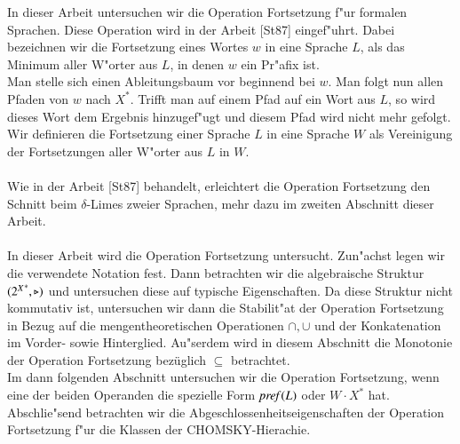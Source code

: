 In dieser Arbeit untersuchen wir die Operation Fortsetzung f"ur formalen Sprachen.
Diese Operation wird in der Arbeit [St87] eingef"uhrt. Dabei bezeichnen wir die Fortsetzung eines Wortes $w$ in eine Sprache $L$, als das Minimum aller W"orter aus $L$, in denen $w$ ein Pr"afix ist. 
\\Man stelle sich einen Ableitungsbaum vor beginnend bei $w$.
Man folgt nun allen Pfaden von $w$ nach $X^*$. Trifft man auf einem Pfad auf ein Wort aus $L$, so wird dieses Wort dem Ergebnis hinzugef"ugt und diesem Pfad wird nicht mehr gefolgt.\\
Wir definieren die Fortsetzung einer Sprache $L$ in eine Sprache $W$ als Vereinigung der Fortsetzungen aller W"orter aus $L$ in $W$.\\\\
Wie in der Arbeit [St87] behandelt, erleichtert die Operation Fortsetzung den Schnitt beim $\delta$-Limes zweier Sprachen, mehr dazu im zweiten Abschnitt dieser Arbeit.\\\\
In dieser Arbeit wird die Operation Fortsetzung untersucht. Zun"achst legen wir die verwendete Notation fest. Dann betrachten wir die algebraische Struktur $({2^X}^*,\triangleright)$ und untersuchen diese auf typische Eigenschaften.
Da diese Struktur nicht kommutativ ist, untersuchen wir dann die Stabilit"at der Operation Fortsetzung in Bezug auf die mengentheoretischen Operationen $\cap,\cup$ und der Konkatenation im Vorder- sowie Hinterglied.
Au"serdem wird in diesem Abschnitt die Monotonie der Operation Fortsetzung bezüglich $\subseteq$ betrachtet.
\\Im dann folgenden Abschnitt untersuchen wir die Operation Fortsetzung, wenn eine der beiden Operanden die spezielle Form $\mathit{pref{(}}L)$ oder $W\cdot X^*$ hat. Abschlie"send betrachten wir die Abgeschlossenheitseigenschaften der Operation Fortsetzung f"ur die Klassen der CHOMSKY-Hierachie.



